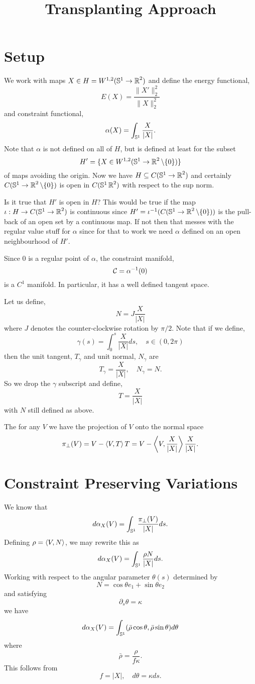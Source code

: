 \documentclass[12pt]{article}
\title{Transplanting Approach}
\date{}
\begin{document}
\maketitle

\section{Setup}

We work with maps \(X \in H = W^{1,2} (\operatorname{\mathbb{S}^1} \to \operatorname{\mathbb{R}}^2)\) and define the energy functional,
\[
E(X) = \frac{\|X'\|_2^2}{\|X\|_2^2}
\]
and constraint functional,
\[
\alpha(X) = \int_{\operatorname{\mathbb{S}^1}} \frac{X}{|X|}.
\]
Note that \(\alpha\) is not defined on all of \(H\), but is defined at least for the subset
\[
H' = \{X \in W^{1,2} (\operatorname{\mathbb{S}^1} \to \operatorname{\mathbb{R}}^2 \backslash \{0\})\}
\]
of maps avoiding the origin. Now we have \(H \subseteq C(\operatorname{\mathbb{S}^1} \to \operatorname{\mathbb{R}}^2)\) and certainly \(C(\operatorname{\mathbb{S}^1} \to \operatorname{\mathbb{R}}^2 \backslash \{0\})\) is open in \(C(\operatorname{\mathbb{S}^1} \operatorname{\mathbb{R}}^2)\) with respect to the sup norm.

{\color{red} Is it true that \(H'\) is open in \(H\)? This would be true if the map \(\iota : H \to C(\operatorname{\mathbb{S}^1} \to \operatorname{\mathbb{R}}^2)\) is continuous since \(H' = \iota^{-1}(C(\operatorname{\mathbb{S}^1} \to \operatorname{\mathbb{R}}^2 \backslash \{0\}))\) is the pull-back of an open set by a continuous map. If not then that messes with the regular value stuff for \(\alpha\) since for that to work we need \(\alpha\) defined on an open neighbourhood of \(H'\).}

Since \(0\) is a regular point of \(\alpha\), the constraint manifold,
\[
\operatorname{\mathcal{C}} = \alpha^{-1} (0)
\]
is a \(C^1\) manifold. In particular, it has a well defined tangent space.

Let us define,
\[
N = J \frac{X}{|X|}
\]
where \(J\) denotes the counter-clockwise rotation by \(\pi/2\). Note that if we define,
\[
\gamma(s) = \int_0^s \frac{X}{|X|} ds, \quad s \in (0, 2\pi)
\]
then the unit tangent, \(T_{\gamma}\) and unit normal, \(N_{\gamma}\) are
\[
T_{\gamma} = \frac{X}{|X|}, \quad N_{\gamma} = N.
\]
So we drop the \(\gamma\) subscript and define,
\[
T = \frac{X}{|X|}
\]
with \(N\) still defined as above.

The for any \(V\) we have the projection of \(V\) onto the normal space
\[
\pi_{\perp} (V) = V - \left\langle{V},{T}\right\rangle T = V - \left\langle{V},{\frac{X}{|X|}}\right\rangle \frac{X}{|X|}.
\]


\section{Constraint Preserving Variations}

We know that
\[
d\alpha_X (V) = \int_{\operatorname{\mathbb{S}^1}} \frac{\pi_{\perp} (V)}{|X|} ds.
\]
Defining \(\rho = \left\langle{V},{N}\right\rangle\), we may rewrite this as
\[
d\alpha_X (V) = \int_{\operatorname{\mathbb{S}^1}} \frac{\rho N}{|X|} ds.
\]
Working with respect to the angular parameter \(\theta(s)\) determined by
\[
N = \cos \theta e_1 + \sin \theta e_2
\]
and satisfying
\[
\partial_s \theta = \kappa
\]
we have
\[
d\alpha_X (V) = \int_{\operatorname{\mathbb{S}^1}} (\bar{\rho} \cos\theta, \bar{\rho} \sin\theta) d\theta
\]
where
\[
\bar{\rho} = \frac{\rho}{f \kappa}.
\]
This follows from
\[
f = |X|, \quad d\theta = \kappa ds.
\]
\end{document}
